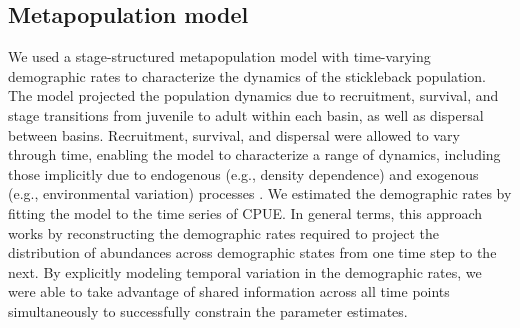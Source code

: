 \documentclass[11pt]{article}
\begin{document}
\subsection*{Metapopulation model} 

We used a stage-structured metapopulation model \citep{caswell2001matrix}
with time-varying demographic rates
to characterize the dynamics of the stickleback population. 
The model projected the population dynamics due to 
recruitment, survival, and stage transitions 
from juvenile to adult within each basin,
as well as dispersal between basins. 
Recruitment, survival, and dispersal were allowed to vary through time,
enabling the model to characterize a range of dynamics, 
including those implicitly due to endogenous (e.g., density dependence) 
and exogenous (e.g., environmental variation) processes
\citep{zeng1998, ives2012, phillips2022}. 
We estimated the demographic rates by  
fitting the model to the time series of CPUE. 
In general terms, this approach works by reconstructing the demographic rates required
to project the distribution of abundances across demographic states 
from one time step to the next. 
By explicitly modeling temporal variation in the demographic rates,
we were able to take advantage of shared information across all time points simultaneously 
to successfully constrain the parameter estimates.
\end{document}
